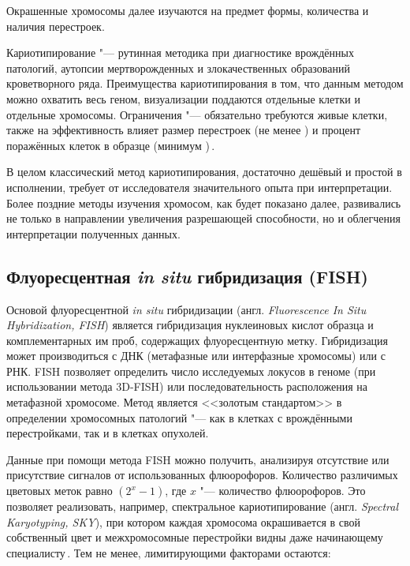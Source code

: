 \documentclass[12pt, twoside, a4paper]{article}
\newcommand{\engterm}[1]{англ. \textenglish{\textit{#1}}}
\begin{document}
Окрашенные хромосомы далее изучаются на предмет формы, количества и наличия перестроек.

Кариотипирование "--- рутинная методика при диагностике врождённых патологий, аутопсии мертворожденных и злокачественных образований кроветворного ряда.
Преимущества кариотипирования в том, что данным методом можно охватить весь геном, визуализации поддаются отдельные клетки и отдельные хромосомы.
Ограничения "--- обязательно требуются живые клетки, также на эффективность влияет размер перестроек (не менее ) и процент поражённых клеток в образце (минимум )\,\cite{Sampson_2014}.

В целом классический метод кариотипирования, достаточно дешёвый и простой в исполнении, требует от исследователя значительного опыта при интерпретации.
Более поздние методы изучения хромосом, как будет показано далее, развивались не только в направлении увеличения разрешающей способности, но и облегчения интерпретации полученных данных.

\subsection*{Флуоресцентная \textit{in situ} гибридизация (FISH)}

Основой флуоресцентной \textit{in situ} гибридизации (\engterm{Fluorescence In Situ Hybridization, FISH}) является гибридизация нуклеиновых кислот образца и комплементарных им проб, содержащих флуоресцентную метку.
Гибридизация может производиться с ДНК (метафазные или интерфазные хромосомы) или с РНК.
FISH позволяет определить число исследуемых локусов в геноме (при использовании метода 3D-FISH) или последовательность расположения на метафазной хромосоме.
Метод является <<золотым стандартом>> в определении хромосомных патологий "--- как в клетках с врождёнными перестройками, так и в клетках опухолей.

Данные при помощи метода FISH можно получить, анализируя отсутствие или присутствие сигналов от использованных флюорофоров.
Количество различимых цветовых меток равно $(2^x - 1)$, где  $x$ "--- количество флюорофоров.
Это позволяет реализовать, например, спектральное кариотипирование (\engterm{Spectral Karyotyping, SKY}), при котором каждая хромосома окрашивается в свой собственный цвет и межхромосомные перестройки видны даже начинающему специалисту\,\cite{Guo_2014}.
Тем не менее, лимитирующими факторами остаются:
\end{document}
